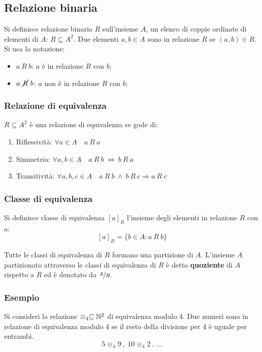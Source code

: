 \subsection*{Relazione binaria}
Si definisce relazione binaria $R$ sull'insieme $A$, un elenco di coppie ordinate
di elementi di $A$: $R\subseteq A^2$. Due elementi $a,b\in A$ sono in relazione 
$R$ se $(a,b)\in R$. Si usa la notazione:
\begin{itemize}
    \item $a \ R \ b$: $a$ è in relazione $R$ con $b$;
    \item $a\ \cancel{R} \ b$: $a$ non è in relazione $R$ con $b$;
\end{itemize}

\subsubsection*{Relazione di equivalenza}
$R\subseteq A^2$ è una relazione di equivalenza se gode di:
\begin{enumerate}
    \item Riflessività: $\forall a \in A \quad a \ R \ a$
    \item Simmetria: $\forall a,b \in A \quad a \ R \ b \ \Leftrightarrow \ b \ R \ a$
    \item Transitività: $\forall a,b,c \in A \quad a \ R \ b
    \ \wedge \ b \ R \ c \Rightarrow a \ R \ c $
\end{enumerate}

\subsubsection*{Classe di equivalenza}
Si definisce classe di equivalenza $[a]_R$ l'insieme degli elementi in relazione $R$
con $a$:
$$ [a]_R =\{b\in A: a \ R \ b\} $$

Tutte le classi di equivalenza di $R$ formano una partizione di $A$. L'insieme $A$
partizionato attraverso le classi di equivalenza di $R$ è detto \textbf{quoziente}
di $A$ rispetto a $R$ ed è denotato da $\sfrac{A}{R}$.

\subsubsection*{Esempio}
Si consideri la relazione $\equiv_4\subseteq\mathbb{N}^2$ di equivalenza modulo 4. Due numeri
sono in relazione di equivalenza modulo 4 se il resto della divisione per 4 è uguale
per entrambi.
$$ 5\equiv_4 9\ , \ 10\equiv_4 2 \ , \ \dots $$

